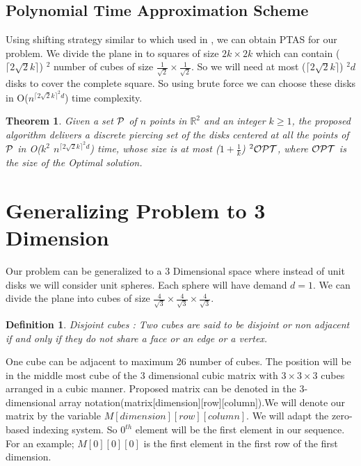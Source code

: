 \documentclass[a4paper,10pt]{article}  %
\newtheorem{theorem}{Theorem}
\newtheorem{definition}{Definition}
\begin{document}
	\subsection{Polynomial Time Approximation Scheme}
		
	Using shifting strategy similar to which used in \cite{DeDCN13}, we can obtain PTAS for our problem. We divide the plane in to squares of size $2k \times 2k$ which can contain ($\lceil 2\sqrt{2}k \rceil$) $^2$ number of cubes of size $\frac{1}{\sqrt{2}} \times \frac{1}{\sqrt{2}}$. So we will need at most ($\lceil 2\sqrt{2}k \rceil$) $^2d$ disks to cover the complete square. So using brute force we can choose these disks in O($n^{{\lceil 2\sqrt{2}k \rceil}^2d}$) time complexity.
	
	\theoremstyle{theorem}
	\begin{theorem}
		Given a set ${\cal P}$ of $n$ points in $\mathbb{R}^2$ and an integer $k \geq 1$, the proposed algorithm delivers a discrete piercing set of the disks centered at all the points of ${\cal P}$ in O($k^2$ $n^{{\lceil 2\sqrt{2}k \rceil}^2d}$) time, whose size is at most ($1 + \frac{1}{k}$) $^2 {\cal OPT}$, where ${\cal OPT}$ is the size of the Optimal solution\cite{DeDCN13}.
	\end{theorem}
	
	\section{Generalizing Problem to 3 Dimension}
	
	Our problem can be generalized to a 3 Dimensional space where instead of unit disks we will consider unit spheres. Each sphere will have demand $d = 1$. We can divide the plane into cubes of size $\frac{4}{\sqrt{3}} \times \frac{4}{\sqrt{3}} \times \frac{4}{\sqrt{3}}$. 
	
	
	
	\theoremstyle{definition}
	\begin{definition}{Disjoint cubes :}
		Two cubes are said to be disjoint or non adjacent if and only if they do not share a face or an edge or a vertex.
	\end{definition}
	
	One cube can be adjacent to maximum 26 number of cubes. The position will be in the middle most cube of the 3 dimensional cubic matrix with $3 \times 3 \times 3$ cubes arranged in a cubic manner. Proposed matrix can be denoted in the $3$- dimensional array notation(matrix[dimension][row][column]).We will denote our matrix by the variable $M[dimension][row][column]$. We will adapt the zero-based indexing system. So $0^{th}$ element will be the first element in our sequence. For an example; $M[0][0][0]$ is the first element in the first row of the first dimension.
	
\end{document}

